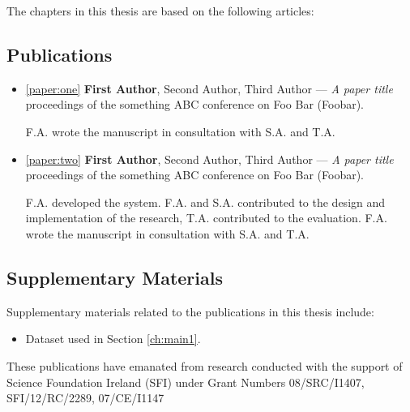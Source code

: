 
The chapters in this thesis are based on the following articles:

\subsection{Publications}

\begin{itemize}

\item \ref{paper:one} \textbf{First Author}, Second Author, Third Author --- \emph{A paper title} \cite{10.1371/journal.pcbi.1005619} proceedings of the something ABC conference on Foo Bar (Foobar). 

F.A. wrote the manuscript in consultation with S.A. and T.A.

\item \ref{paper:two} \textbf{First Author}, Second Author, Third Author --- \emph{A paper title} \cite{morley2014academic} proceedings of the something ABC conference on Foo Bar (Foobar).

F.A. developed the system. F.A. and S.A. contributed to the design and implementation of the research, T.A. contributed to the evaluation. F.A. wrote the manuscript in consultation with S.A. and T.A.

\end{itemize}

\pagebreak

\subsection{Supplementary Materials}

Supplementary materials related to the publications in this thesis include: 

\begin{itemize}

\item Dataset \cite{puschel2008small} used in Section \ref{ch:main1}.

\end{itemize}

These publications have emanated from research conducted with the support of Science Foundation Ireland (SFI) under Grant Numbers 08/SRC/I1407, SFI/12/RC/2289, 07/CE/I1147

